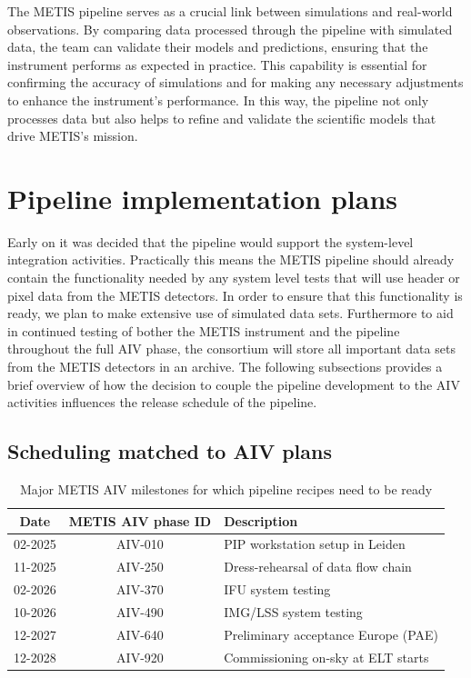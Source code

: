 \documentclass[a4paper]{spie}  %
\begin{document}
The METIS pipeline serves as a crucial link between simulations and real-world observations. By comparing data processed through the pipeline with simulated data, the team can validate their models and predictions, ensuring that the instrument performs as expected in practice. This capability is essential for confirming the accuracy of simulations and for making any necessary adjustments to enhance the instrument's performance. In this way, the pipeline not only processes data but also helps to refine and validate the scientific models that drive METIS's mission.


\section{Pipeline implementation plans}
\label{sec:imp}

Early on it was decided that the pipeline would support the system-level integration activities.
Practically this means the METIS pipeline should already contain the functionality needed by any system level tests that will use header or pixel data from the METIS detectors.
In order to ensure that this functionality is ready, we plan to make extensive use of simulated data sets. 
Furthermore to aid in continued testing of bother the METIS instrument and the pipeline throughout the full AIV phase, the consortium will store all important data sets from the METIS detectors in an archive.
The following subsections provides a brief overview of how the decision to couple the pipeline development to the AIV activities influences the release schedule of the pipeline.

\subsection{Scheduling matched to AIV plans}
\label{subsec:imp_aiv}

\begin{table}[]
    \centering
\caption{Major METIS AIV milestones for which pipeline recipes need to be ready}
\label{tab:dev_aiv_milestones}
    \begin{tabular}{c|c|l}
    \hline
    \hline
         Date &   METIS AIV phase ID & Description\\
         \hline
         02-2025 &   AIV-010&PIP workstation setup in Leiden\\
         11-2025 &   AIV-250&Dress-rehearsal of data flow chain\\
 02-2026 & AIV-370&IFU system testing\\
 10-2026 &  AIV-490&IMG/LSS system testing\\
 12-2027 & AIV-640&Preliminary acceptance Europe (PAE)\\
 12-2028 & AIV-920&Commissioning on-sky at ELT starts\\
 \hline
 \end{tabular}
      
\end{table}
\end{document}
